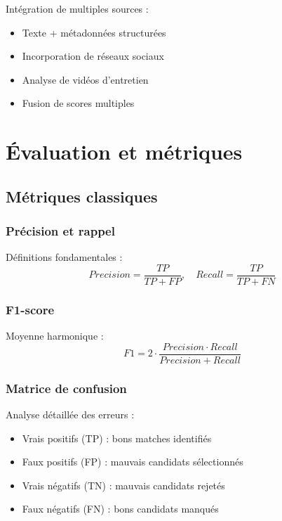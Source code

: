 \documentclass[12pt,a4paper]{report}
\begin{document}
Intégration de multiples sources :
\begin{itemize}
\item Texte + métadonnées structurées
\item Incorporation de réseaux sociaux
\item Analyse de vidéos d'entretien
\item Fusion de scores multiples
\end{itemize}

\section{Évaluation et métriques}

\subsection{Métriques classiques}

\subsubsection{Précision et rappel}

Définitions fondamentales :
\begin{equation}
Precision = \frac{TP}{TP + FP}, \quad Recall = \frac{TP}{TP + FN}
\end{equation}

\subsubsection{F1-score}

Moyenne harmonique :
\begin{equation}
F1 = 2 \cdot \frac{Precision \cdot Recall}{Precision + Recall}
\end{equation}

\subsubsection{Matrice de confusion}

Analyse détaillée des erreurs :
\begin{itemize}
\item Vrais positifs (TP) : bons matches identifiés
\item Faux positifs (FP) : mauvais candidats sélectionnés
\item Vrais négatifs (TN) : mauvais candidats rejetés
\item Faux négatifs (FN) : bons candidats manqués
\end{itemize}
\end{document}
